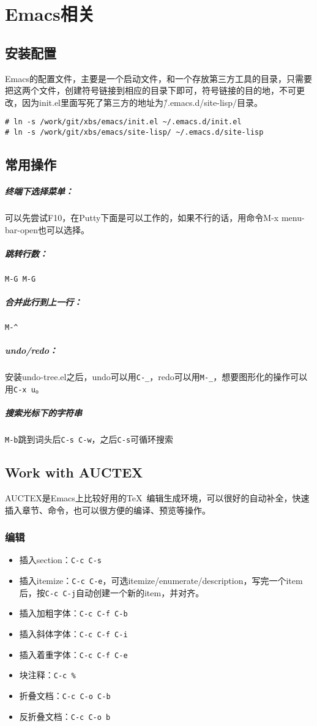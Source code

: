 \section{Emacs相关}
\subsection{安装配置}
Emacs的配置文件，主要是一个启动文件，和一个存放第三方工具的目录，只需要把这两个文件，创建符号链接到相应的目录下即可，符号链接的目的地，不可更改，因为init.el里面写死了第三方的地址为\~/.emacs.d/site-lisp/目录。
\begin{lstlisting}[numbers=none]
# ln -s /work/git/xbs/emacs/init.el ~/.emacs.d/init.el
# ln -s /work/git/xbs/emacs/site-lisp/ ~/.emacs.d/site-lisp
\end{lstlisting}

\subsection{常用操作}

\subparagraph{终端下选择菜单：}
可以先尝试F10，在Putty下面是可以工作的，如果不行的话，用命令M-x menu-bar-open也可以选择。
\subparagraph{跳转行数：}
\verb|M-G M-G|
\subparagraph{合并此行到上一行：}
\verb|M-^|
\subparagraph{undo/redo：}
安装undo-tree.el之后，undo可以用\verb|C-_|，redo可以用\verb|M-_|，想要图形化的操作可以用\verb|C-x u|。
\subparagraph{搜索光标下的字符串}
\verb|M-b|跳到词头后\verb|C-s C-w|，之后\verb|C-s|可循环搜索

\subsection{Work with AUCTEX}
\label{sec:work-with-auctex}
AUCTEX是Emacs上比较好用的\TeX~编辑生成环境，可以很好的自动补全，快速插入章节、命令，也可以很方便的编译、预览等操作。
\subsubsection{编辑}
\label{sec:auctex-edit}
\begin{itemize}
\item 插入section：\verb|C-c C-s|
\item 插入itemize：\verb|C-c C-e|，可选itemize/enumerate/description，写完一个item后，按\verb|C-c C-j|自动创建一个新的item，并对齐。
\item 插入加粗字体：\verb|C-c C-f C-b|
\item 插入斜体字体：\verb|C-c C-f C-i|
\item 插入着重字体：\verb|C-c C-f C-e|
\item 块注释：\verb|C-c %|
\item 折叠文档：\verb|C-c C-o C-b|
\item 反折叠文档：\verb|C-c C-o b|
\end{itemize}

